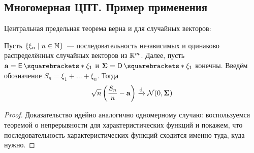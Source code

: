 \subsection{Многомерная ЦПТ. Пример применения}
Центральная предельная теорема верна и для случайных векторов:
\begin{theorem}
	Пусть \(\{\xi_n \mid n \in \mathbb{N}\}\)~--- последовательность независимых и одинаково распределённых случайных векторов из \(\mathbb{R}^{m}\). Далее, пусть \(\mathbf{a} = \E{\xi_1}\) и \(\mathbf{\Sigma} = \D{\xi_1}\) конечны. Введём обозначение \(S_n = \xi_1 + \dots + \xi_n\). Тогда
	\[
		\sqrt{n}\left(\frac{S_n}{n} - \mathbf{a}\right) \xrightarrow{\mathrm{d}} \mathcal{N}(0, \mathbf{\Sigma})
	\]
\end{theorem}
\begin{proof}
	Доказательство идейно аналогично одномерному случаю: воспользуемся теоремой о непрерывности для характеристических функций и покажем, что последовательность характеристических функций сходится именно туда, куда нужно.
\end{proof}

